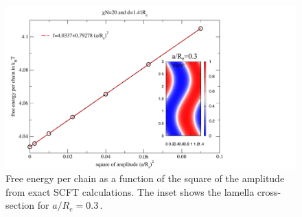 \documentclass[bachelor,       %
               oneside,        %
               BCOR10mm,       %
               ngerman, english %
               ]{GAUBM}
\begin{document}









\begin{figure}[H]
    \centering
    \includegraphics[width=0.6\linewidth]{figures/bend_scft.pdf}
    \caption{Free energy per chain as a function of the square of the amplitude from exact \ac{SCFT} calculations. The inset shows the lamella cross-section for $a/R_e=0.3\,.$}
    \label{fig:bend_scft}
\end{figure}
\end{document}
